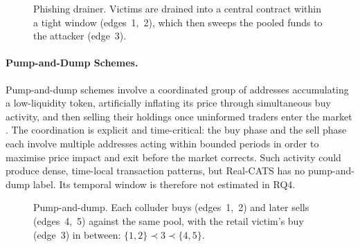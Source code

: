 \documentclass{thesisclass}
\begin{document}
\begin{figure}[ht]
  \centering
  \caption[Phishing transfer sequence]{Phishing drainer. Victims are drained into a
    central contract within a tight window (edges~1,~2), which then sweeps the
    pooled funds to the attacker (edge~3).}
  \label{fig:motif-phishing}
\end{figure}

\paragraph{Pump-and-Dump Schemes.}
Pump-and-dump schemes involve a coordinated group of addresses accumulating a low-liquidity token, artificially inflating its price through simultaneous buy activity, and then selling their holdings once uninformed traders enter the market \citep{li2021cryptocurrency, hornuf2025cybercrime}. The coordination is explicit and time-critical: the buy phase and the sell phase each involve multiple addresses acting within bounded periods in order to maximise price impact and exit before the market corrects. Such activity could produce dense, time-local transaction patterns, but Real-CATS has no pump-and-dump label. Its temporal window is therefore not estimated in RQ4.

\begin{figure}[ht]
  \centering
  \caption[Pump-and-dump transfer sequence]{Pump-and-dump. Each colluder buys
    (edges~1,~2) and later sells (edges~4,~5) against the same pool, with the
    retail victim's buy (edge~3) in between: $\{1,2\} \prec 3 \prec \{4,5\}$.}
  \label{fig:motif-pumpdump}
\end{figure}
\end{document}
